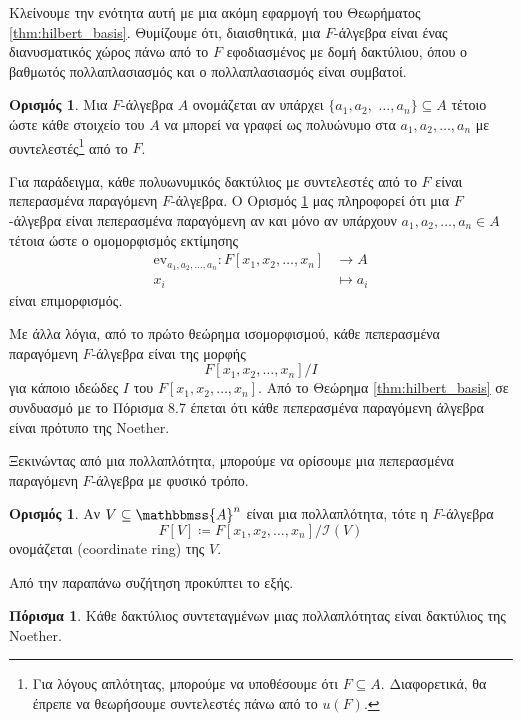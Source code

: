 \documentclass[12pt,a4paper,reqno]{amsart}
\theoremstyle{definition}
\newtheorem{corollary}[theorem]{Πόρισμα}
\newtheorem{definition}[theorem]{Ορισμός}
\theoremstyle{remark}
\numberwithin{theorem}{section}
\numberwithin{exercise}{section}
\numberwithin{equation}{section}
\renewcommand{\AA}{\mathbbmss{A}}
\newcommand{\iI}{\mathcal{I}}
\renewcommand{\to}{\rightarrow}
\newcommand{\ev}{\mathrm{ev}}
\newcommand{\Pol}[1]{F[x_1, x_2, \dots, x_{#1}]}
\newcommand{\defn}[1]{{\color{mylightblue}{#1}}}
\begin{document}
Κλείνουμε την ενότητα αυτή με μια ακόμη εφαρμογή του Θεωρήματος \ref{thm:hilbert_basis}. Θυμίζουμε ότι, διαισθητικά, μια $F$-άλγεβρα είναι ένας διανυσματικός χώρος πάνω από το $F$ εφοδιασμένος με δομή δακτύλιου, όπου ο βαθμωτός πολλαπλασιασμός και ο πολλαπλασιασμός είναι συμβατοί.

\begin{definition}
    \label{def:finitely_generated_algebras}
    Μια $F$-άλγεβρα $A$ ονομάζεται \defn{πεπερασμένα παραγόμενη} αν υπάρχει $\{a_1, a_2,$ $\dots, a_n\} \subseteq A$ τέτοιο ώστε κάθε στοιχείο του $A$ να μπορεί να γραφεί ως πολυώνυμο στα $a_1, a_2, \dots, a_n$ με συντελεστές\footnote{Για λόγους απλότητας, μπορούμε να υποθέσουμε ότι $F \subseteq A$. Διαφορετικά, θα έπρεπε να θεωρήσουμε συντελεστές πάνω από το $u(F)$.} από το $F$.
\end{definition}

Για παράδειγμα, κάθε πολυωνυμικός δακτύλιος με συντελεστές από το $F$ είναι πεπερασμένα παραγόμενη $F$-άλγεβρα. Ο Ορισμός \ref{def:finitely_generated_algebras} μας πληροφορεί ότι μια $F$-άλγεβρα είναι πεπερασμένα παραγόμενη αν και μόνο αν υπάρχουν $a_1, a_2, \dots, a_n \in A$ τέτοια ώστε ο ομομορφισμός εκτίμησης
\begin{align*}
    \ev_{a_1, a_2, \dots, a_n} : F[x_1, x_2, \dots, x_n] &\to A \\
    x_i &\mapsto a_i
\end{align*}
είναι επιμορφισμός. 

Με άλλα λόγια, από το πρώτο θεώρημα ισομορφισμού, κάθε πεπερασμένα παραγόμενη $F$-άλγεβρα είναι της μορφής 
\[
F[x_1, x_2, \dots, x_n] / I
\]
για κάποιο ιδεώδες $I$ του $\Pol{n}$. Από το Θεώρημα \ref{thm:hilbert_basis} σε συνδυασμό με το Πόρισμα 8.7 έπεται ότι κάθε πεπερασμένα παραγόμενη άλγεβρα είναι πρότυπο της Noether. 

Ξεκινώντας από μια πολλαπλότητα, μπορούμε να ορίσουμε μια πεπερασμένα παραγόμενη $F$-άλγεβρα με φυσικό τρόπο.
\begin{definition}
    \label{def:coordinate_ring}
    Αν $V \subseteq \AA^n$ είναι μια πολλαπλότητα, τότε η $F$-άλγεβρα 
    \[
    F[V] \coloneqq F[x_1, x_2, \dots, x_n] / \iI(V)
    \]
    ονομάζεται \defn{δακτύλιος συντεταγμένων} (coordinate ring) της $V$.
\end{definition}

Από την παραπάνω συζήτηση προκύπτει το εξής.

\begin{corollary}
    \label{cor:coordinate_rings}
    Κάθε δακτύλιος συντεταγμένων μιας πολλαπλότητας είναι δακτύλιος της Noether.
\end{corollary}
\end{document}
